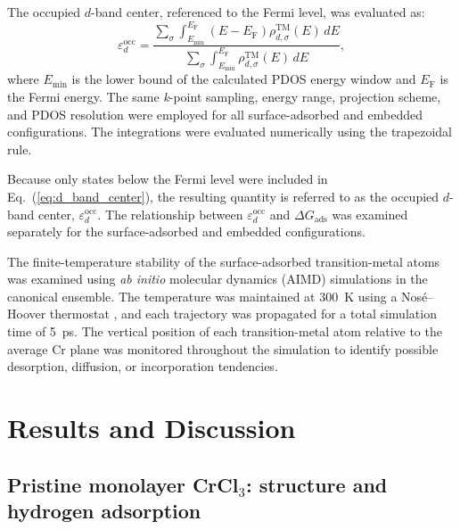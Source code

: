 \documentclass[journal=jacsat,manuscript=article]{achemso}
\begin{document}
The occupied $d$-band center, referenced to the Fermi level,
was evaluated as:
\begin{equation}
    \varepsilon_{d}^{\mathrm{occ}}
    =
    \frac{
    \displaystyle
    \sum_{\sigma}
    \int_{E_{\min}}^{E_{\mathrm{F}}}
    (E-E_{\mathrm{F}})
    \rho_{d,\sigma}^{\mathrm{TM}}(E)\,dE
    }{
    \displaystyle
    \sum_{\sigma}
    \int_{E_{\min}}^{E_{\mathrm{F}}}
    \rho_{d,\sigma}^{\mathrm{TM}}(E)\,dE
    },
    \label{eq:d_band_center}
\end{equation}
where $E_{\min}$ is the lower bound of the calculated PDOS energy window and $E_{\mathrm{F}}$ is the Fermi energy. The same \textit{k}-point sampling, energy range, projection scheme, and PDOS resolution were employed for all surface-adsorbed and embedded configurations. The integrations were evaluated numerically using the trapezoidal rule.

Because only states below the Fermi level were included in Eq.~(\ref{eq:d_band_center}), the resulting quantity is referred to as the occupied $d$-band center, $\varepsilon_{d}^{\mathrm{occ}}$. The relationship between $\varepsilon_{d}^{\mathrm{occ}}$ and $\Delta G_{\mathrm{ads}}$ was examined separately for the surface-adsorbed and embedded configurations.

The finite-temperature stability of the surface-adsorbed transition-metal atoms was examined using \textit{ab initio} molecular dynamics (AIMD) simulations in the canonical ensemble. The temperature was maintained at 300~K using a Nosé--Hoover thermostat \cite{Nose1984,Hoover1985}, and each trajectory was propagated for a total simulation time of 5~ps. The vertical position of each transition-metal atom relative to the average Cr plane was monitored throughout the simulation to identify possible desorption, diffusion, or incorporation tendencies.

\section{Results and Discussion}

\subsection{Pristine monolayer CrCl$_3$: structure and hydrogen adsorption}
\end{document}
